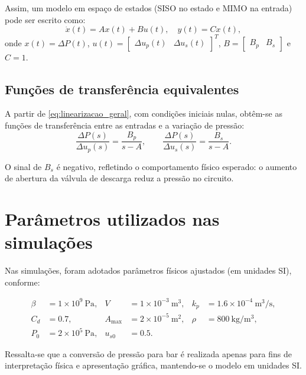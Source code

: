 Assim, um modelo em espaço de estados (SISO no estado e MIMO na entrada) pode ser escrito como:
\begin{equation}
\dot{x}(t) = A x(t) + B u(t), \quad y(t) = C x(t),
\label{eq:ss_linear}
\end{equation}
onde $x(t)=\Delta P(t)$, $u(t) = \begin{bmatrix}\Delta u_p(t) & \Delta u_s(t)\end{bmatrix}^T$,
$B=\begin{bmatrix}B_p & B_s\end{bmatrix}$ e $C=1$.

\subsection{Funções de transferência equivalentes}
\label{subsec:controle-fts}

A partir de \eqref{eq:linearizacao_geral}, com condições iniciais nulas, obtêm-se as funções de transferência entre as entradas e a variação de pressão:
\begin{equation}
\frac{\Delta P(s)}{\Delta u_p(s)} = \frac{B_p}{s - A},
\qquad
\frac{\Delta P(s)}{\Delta u_s(s)} = \frac{B_s}{s - A}.
\label{eq:fts}
\end{equation}

O sinal de $B_s$ é negativo, refletindo o comportamento físico esperado: o aumento de abertura da válvula de descarga reduz a pressão no circuito.

\section{Parâmetros utilizados nas simulações}
\label{sec:controle-parametros}

Nas simulações, foram adotados parâmetros físicos ajustados (em unidades SI), conforme:

\begin{align*}
\beta &= 1\times 10^9 \ \text{Pa}, &
V &= 1\times 10^{-3} \ \text{m}^3, &
k_p &= 1.6\times 10^{-4} \ \text{m}^3/\text{s}, \\
C_d &= 0.7, &
A_{\max} &= 2\times 10^{-5} \ \text{m}^2, &
\rho &= 800 \ \text{kg}/\text{m}^3,\\
P_0 &= 2\times 10^{5} \ \text{Pa}, &
u_{s0} &= 0.5. &&
\end{align*}

Ressalta-se que a conversão de pressão para bar é realizada apenas para fins de interpretação física e apresentação gráfica, mantendo-se o modelo em unidades SI.

